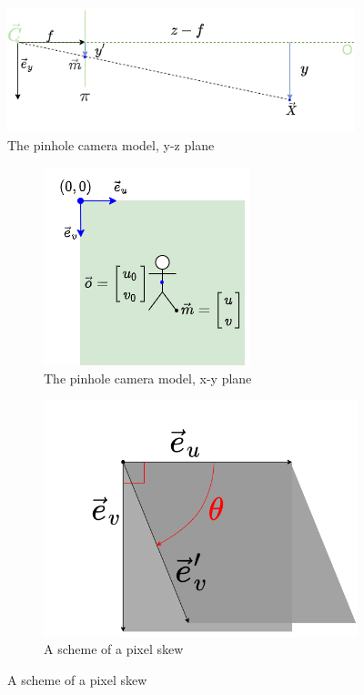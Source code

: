 \begin{figure}[h]
    \centering
    \includegraphics[width=0.9\textwidth]{graphics/td_scene_yz.png}
    \caption{The pinhole camera model, y-z plane}
    \label{fig:td_scene_yz}
\end{figure}

\begin{figure}[h]
  \begin{subfigure}[b]{0.5\textwidth}
    \centering
    \includegraphics[width=.5\textwidth]{graphics/td_scene_xy.png}
    \caption{The pinhole camera model, x-y plane}
    \label{fig:td_scene_xy}
  \end{subfigure}
  \hfill
  \begin{subfigure}[b]{0.5\textwidth}
    \centering
    \includegraphics[width=.5\textwidth]{graphics/pixel.png}
    \caption{A scheme of a pixel skew}
    \label{fig:Kframes}
  \end{subfigure}
\end{figure}

